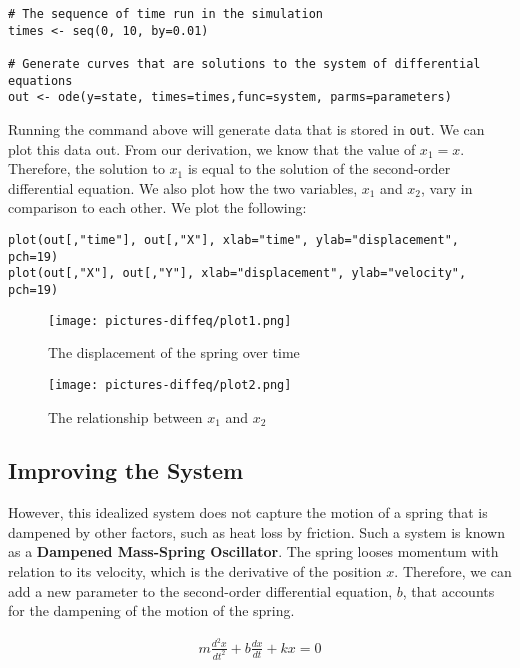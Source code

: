 \begin{lstlisting}
# The sequence of time run in the simulation
times <- seq(0, 10, by=0.01)

# Generate curves that are solutions to the system of differential equations
out <- ode(y=state, times=times,func=system, parms=parameters)
\end{lstlisting}

Running the command above will generate data that is stored in \texttt{out}. We can plot this data out. From our derivation, we know that the value of $x_1=x$. Therefore, the solution to $x_1$ is equal to the solution of the second-order differential equation. We also plot how the two variables, $x_1$ and $x_2$, vary in comparison to each other. We plot the following:\\

\begin{lstlisting}
plot(out[,"time"], out[,"X"], xlab="time", ylab="displacement", pch=19)
plot(out[,"X"], out[,"Y"], xlab="displacement", ylab="velocity", pch=19)
\end{lstlisting}

\begin{figure}[H]
    \centering
    \texttt{[image: pictures-diffeq/plot1.png]}
    \caption{The displacement of the spring over time}
\end{figure}

\begin{figure}[H]
    \centering
    \texttt{[image: pictures-diffeq/plot2.png]}
    \caption{The relationship between $x_1$ and $x_2$}
\end{figure}

\subsection{Improving the System}

However, this idealized system does not capture the motion of a spring that is dampened by other factors, such as heat loss by friction. Such a system is known as a \textbf{Dampened Mass-Spring Oscillator}. The spring looses momentum with relation to its velocity, which is the derivative of the position $x$. Therefore, we can add a new parameter to the second-order differential equation, $b$, that accounts for the dampening of the motion of the spring.

\begin{gather*}
    m\frac{d^2 x}{dt^2}+b\frac{dx}{dt}+kx=0
\end{gather*}

